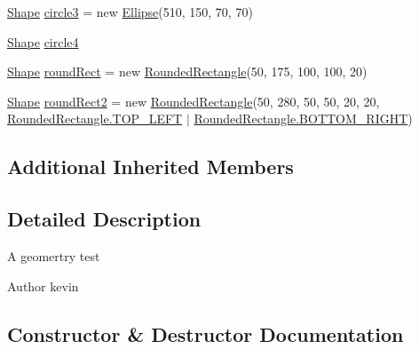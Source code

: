 \begin{DoxyCompactItemize}
\item 
\mbox{\hyperlink{classorg_1_1newdawn_1_1slick_1_1geom_1_1_shape}{Shape}} \mbox{\hyperlink{classorg_1_1newdawn_1_1slick_1_1tests_1_1_geom_test_afb9825cbefc9f50068ea2c2ae54a4933}{circle3}} = new \mbox{\hyperlink{classorg_1_1newdawn_1_1slick_1_1geom_1_1_ellipse}{Ellipse}}(510, 150, 70, 70)
\item 
\mbox{\hyperlink{classorg_1_1newdawn_1_1slick_1_1geom_1_1_shape}{Shape}} \mbox{\hyperlink{classorg_1_1newdawn_1_1slick_1_1tests_1_1_geom_test_ae3d20efbcb1d35c808de53a771997afa}{circle4}}
\item 
\mbox{\hyperlink{classorg_1_1newdawn_1_1slick_1_1geom_1_1_shape}{Shape}} \mbox{\hyperlink{classorg_1_1newdawn_1_1slick_1_1tests_1_1_geom_test_aff21770704a0e362a3a39dcc808d8905}{round\+Rect}} = new \mbox{\hyperlink{classorg_1_1newdawn_1_1slick_1_1geom_1_1_rounded_rectangle}{Rounded\+Rectangle}}(50, 175, 100, 100, 20)
\item 
\mbox{\hyperlink{classorg_1_1newdawn_1_1slick_1_1geom_1_1_shape}{Shape}} \mbox{\hyperlink{classorg_1_1newdawn_1_1slick_1_1tests_1_1_geom_test_a09d095301f5c721d6fadc4d55e36230e}{round\+Rect2}} = new \mbox{\hyperlink{classorg_1_1newdawn_1_1slick_1_1geom_1_1_rounded_rectangle}{Rounded\+Rectangle}}(50, 280, 50, 50, 20, 20, \mbox{\hyperlink{classorg_1_1newdawn_1_1slick_1_1geom_1_1_rounded_rectangle_aaaa1eab1fd4a8d956245dd981ce1dfab}{Rounded\+Rectangle.\+T\+O\+P\+\_\+\+L\+E\+FT}} $\vert$ \mbox{\hyperlink{classorg_1_1newdawn_1_1slick_1_1geom_1_1_rounded_rectangle_a747856ebcd2fa8d0b68c3506a666da20}{Rounded\+Rectangle.\+B\+O\+T\+T\+O\+M\+\_\+\+R\+I\+G\+HT}})
\end{DoxyCompactItemize}
\subsection*{Additional Inherited Members}


\subsection{Detailed Description}
A geomertry test

\begin{DoxyAuthor}{Author}
kevin 
\end{DoxyAuthor}


\subsection{Constructor \& Destructor Documentation}
\mbox{\label{classorg_1_1newdawn_1_1slick_1_1tests_1_1_geom_test_a2f4f50a6ee99e1b6d3441b72bc1f1e40}} 
